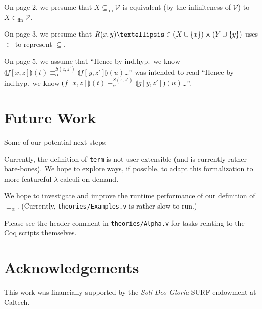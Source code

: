 \documentclass{article}
\begin{document}
On page 2, we presume that $X \subseteq_{\textrm{fin}} \mathcal{V}$ is equivalent (by the
infiniteness of $\mathcal{V}$) to $X \subset_{\textrm{fin}} \mathcal{V}$.

On page 3, we presume that $R(x,y) \textellipsis \in (X \cup \{ x \}) \times (Y \cup \{ y \})$ uses $\in$ to
represent $\subseteq$.

On page 5, we assume that ``Hence by ind.hyp.\ we know $\llparenthesis f[x,z] \rrparenthesis (t)
\equiv_\alpha^{S(z,z')} \llparenthesis f[y,z'] \rrparenthesis (u)$\dots'' was intended to read
``Hence by ind.hyp.\ we know $\llparenthesis f[x,z] \rrparenthesis (t) \equiv_\alpha^{S(z,z')}
\llparenthesis g[y,z'] \rrparenthesis (u)$\dots''.

\section{Future Work}

Some of our potential next steps:

Currently, the definition of \verb|term| is not user-extensible (and is currently rather
bare-bones). We hope to explore ways, if possible, to adapt this formalization to more featureful
$\lambda$-calculi on demand.

We hope to investigate and improve the runtime performance of our definition of $\equiv_\alpha$.
(Currently, \verb|theories/Examples.v| is rather slow to run.)

Please see the header comment in \verb|theories/Alpha.v| for tasks relating to the Coq scripts
themselves.

\section{Acknowledgements}

This work was financially supported by the \emph{Soli Deo Gloria} SURF endowment at Caltech.
\end{document}
